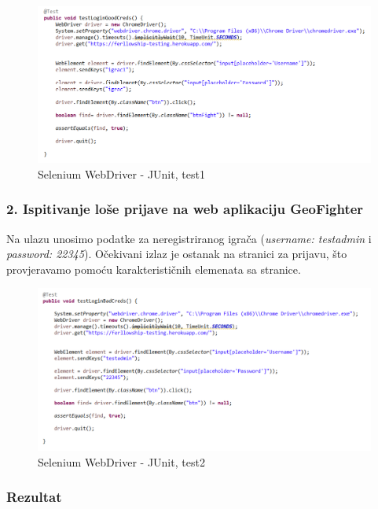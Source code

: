 					\begin{figure}[H]
					\includegraphics[width=\textwidth]{slike/JUSeTest1} 
					\centering
					\caption{Selenium WebDriver - JUnit, test1}
					\label{}
					\end{figure}
				
			\subsubsection{2. Ispitivanje loše prijave na web aplikaciju GeoFighter}
			
				{Na ulazu unosimo podatke za neregistriranog igrača (\emph{username: testadmin} i \emph{password: 22345}). Očekivani izlaz je ostanak na stranici za prijavu, što provjeravamo pomoću karakterističnih elemenata sa stranice.}
			
					\begin{figure}[H]
						\includegraphics[width=\textwidth]{slike/JUSeTest2} 
						\centering
						\caption{Selenium WebDriver - JUnit, test2}
						\label{}
					\end{figure}
			
			\subsubsection{Rezultat}
			
